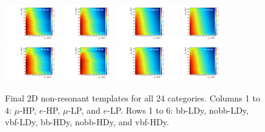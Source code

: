 \begin{figure}[htbp]
  \includegraphics[width=0.2\textwidth]{fig/2Dfit/template_nonRes_mu_HP_nobb_HDy.pdf}
  \includegraphics[width=0.2\textwidth]{fig/2Dfit/template_nonRes_e_HP_nobb_HDy.pdf}
  \includegraphics[width=0.2\textwidth]{fig/2Dfit/template_nonRes_mu_LP_nobb_HDy.pdf}
  \includegraphics[width=0.2\textwidth]{fig/2Dfit/template_nonRes_e_LP_nobb_HDy.pdf}\\
  \includegraphics[width=0.2\textwidth]{fig/2Dfit/template_nonRes_mu_HP_vbf_HDy.pdf}
  \includegraphics[width=0.2\textwidth]{fig/2Dfit/template_nonRes_e_HP_vbf_HDy.pdf}
  \includegraphics[width=0.2\textwidth]{fig/2Dfit/template_nonRes_mu_LP_vbf_HDy.pdf}
  \includegraphics[width=0.2\textwidth]{fig/2Dfit/template_nonRes_e_LP_vbf_HDy.pdf}\\
  \caption{
    Final 2D non-resonant templates for all 24 categories.
    Columns 1 to 4: $\mu$-HP, $e$-HP, $\mu$-LP, and $e$-LP.
    Rows 1 to 6: bb-LDy, nobb-LDy, vbf-LDy, bb-HDy, nobb-HDy, and vbf-HDy.
  }
  \label{fig:templates_nonRes_Run2}
\end{figure}

